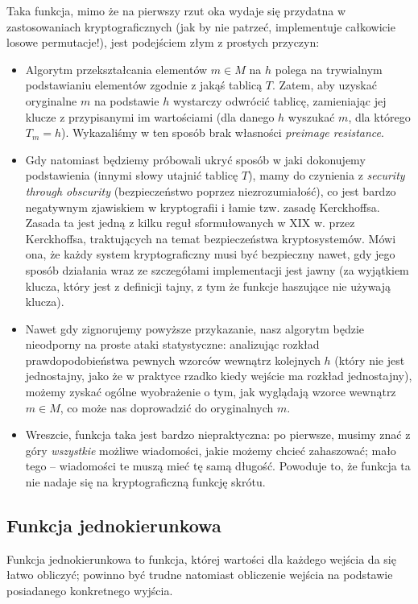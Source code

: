 \documentclass[12pt,a4paper,twoside]{article}
\begin{document}
Taka funkcja, mimo że na pierwszy rzut oka wydaje się przydatna w
zastosowaniach kryptograficznych (jak by nie patrzeć, implementuje całkowicie
losowe permutacje!), jest podejściem złym z prostych przyczyn:

\begin{itemize}
\item Algorytm przekształcania elementów $m \in M$ na $h$ polega na trywialnym
podstawianiu elementów zgodnie z jakąś tablicą $T$. Zatem, aby uzyskać
oryginalne $m$ na podstawie $h$ wystarczy odwrócić tablicę, zamieniając jej
klucze z przypisanymi im wartościami (dla danego $h$ wyszukać $m$, dla którego
$T_m = h$). Wykazaliśmy w ten sposób brak własności \textit{preimage
resistance}.
\item Gdy natomiast będziemy próbowali ukryć sposób w jaki dokonujemy
podstawienia (innymi słowy utajnić tablicę $T$), mamy do czynienia z
\textit{security through obscurity} (bezpieczeństwo poprzez niezrozumiałość),
co jest bardzo negatywnym zjawiskiem w kryptografii i łamie tzw. zasadę
Kerckhoffsa. Zasada ta jest jedną z kilku reguł sformułowanych w XIX w. przez
Kerckhoffsa, traktujących na temat bezpieczeństwa kryptosystemów. Mówi ona, że
każdy system kryptograficzny musi być bezpieczny nawet, gdy jego sposób
działania wraz ze szczegółami implementacji jest jawny (za wyjątkiem klucza,
który jest z definicji tajny, z tym że funkcje haszujące nie używają klucza).
\item Nawet gdy zignorujemy powyższe przykazanie, nasz algorytm będzie
nieodporny na proste ataki statystyczne: analizując rozkład prawdopodobieństwa
pewnych wzorców wewnątrz kolejnych $h$ (który nie jest jednostajny, jako że w
praktyce rzadko kiedy wejście ma rozkład jednostajny), możemy zyskać ogólne
wyobrażenie o tym, jak wyglądają wzorce wewnątrz $m \in M$, co może nas
doprowadzić do oryginalnych $m$.
\item Wreszcie, funkcja taka jest bardzo niepraktyczna: po pierwsze, musimy
znać z góry \emph{wszystkie} możliwe wiadomości, jakie możemy chcieć
zahaszować; mało tego -- wiadomości te muszą mieć tę samą długość. Powoduje to,
że funkcja ta nie nadaje się na kryptograficzną funkcję skrótu.
\end{itemize}



\subsection{Funkcja jednokierunkowa}
Funkcja jednokierunkowa to funkcja, której wartości dla każdego wejścia da się
łatwo obliczyć; powinno być trudne natomiast obliczenie wejścia na podstawie
posiadanego konkretnego wyjścia.
\end{document}
